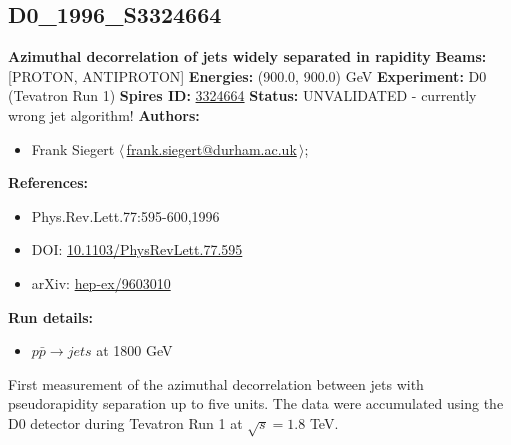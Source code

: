 \clearpage


\clearpage

\subsection[D0\_1996\_S3324664]{D0\_1996\_S3324664\,\cite{Abachi:1996et}}
\textbf{Azimuthal decorrelation of jets widely separated in rapidity}\newline
\textbf{Beams:} [PROTON, ANTIPROTON] \newline
\textbf{Energies:} (900.0, 900.0) GeV \newline
\textbf{Experiment:} D0 (Tevatron Run 1) \newline
\textbf{Spires ID:} \href{http://www.slac.stanford.edu/spires/find/hep/www?rawcmd=key+3324664}{3324664}\newline
\textbf{Status:} UNVALIDATED - currently wrong jet algorithm!\newline
\textbf{Authors:}
\begin{itemize}
  \item Frank Siegert $\langle\,$\href{mailto:frank.siegert@durham.ac.uk}{frank.siegert@durham.ac.uk}$\,\rangle$;
\end{itemize}
\textbf{References:}
\begin{itemize}
  \item Phys.Rev.Lett.77:595-600,1996
  \item DOI: \href{http://dx.doi.org/10.1103/PhysRevLett.77.595}{10.1103/PhysRevLett.77.595}
  \item arXiv: \href{http://arxiv.org/abs/hep-ex/9603010}{hep-ex/9603010}
\end{itemize}
\textbf{Run details:}
\begin{itemize}

  \item $p \bar{p} \to jets$ at 1800 GeV\end{itemize}

\noindent First measurement of the azimuthal decorrelation between jets with pseudorapidity separation up to five units. The data were accumulated using the D0 detector during Tevatron Run 1 at $\sqrt{s}=1.8$ TeV.

\clearpage


\clearpage

